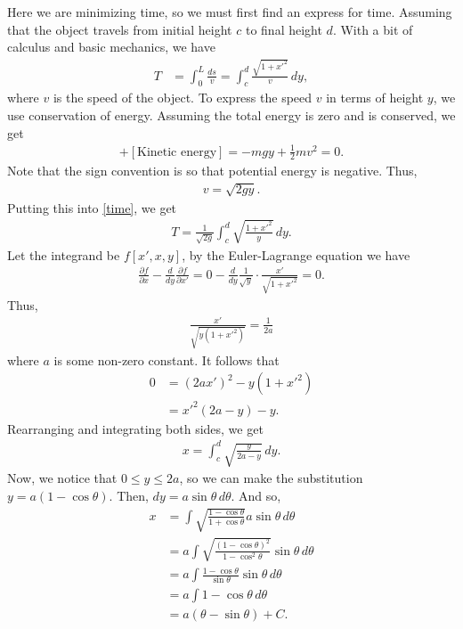 \documentclass{article}
\newcommand{\p}{\partial}
\newcommand{\f}[2]{\frac{#1}{#2}}
\begin{document}
Here we are minimizing time, so we must first find an express for time. Assuming that the object travels from initial height $c$ to final height $d$. With a bit of calculus and basic mechanics, we have
\begin{align}\label{time}
T &= \int_{0}^{L} \frac{ds}{v} = \int_c^d \f{\sqrt{1 + x'^2}}{v}\,dy,
\end{align}
where $v$ is the speed of the object. To express the speed $v$ in terms of height $y$, we use conservation of energy. Assuming the total energy is zero and is conserved, we get
\begin{align}
[\text{Potential Energy}] + [\text{Kinetic energy}] = - mgy + \frac{1}{2}mv^2 = 0.
\end{align}
Note that the sign convention is so that potential energy is negative. Thus,
\begin{align}
v = \sqrt{2gy}.
\end{align}
Putting this into \eqref{time}, we get
\begin{align}
T = \frac{1}{\sqrt{2g}}\int^d_c \sqrt{\f{1 + x'^2}{y}}\,dy.
\end{align}
Let the integrand be $f[x',x,y]$, by the Euler-Lagrange equation we have
\begin{align}
\frac{\p f}{\p x} - \f{d}{dy}\f{\p f}{\p x'} = 0 - \frac{d}{dy}\f{1}{\sqrt{y}}\cdot \f{x'}{\sqrt{1 + x'^2}}  = 0.
\end{align}
Thus,
\begin{align}
\f{x'}{\sqrt{y(1+x'^2)}} = \f{1}{2a}
\end{align}
where $a$ is some non-zero constant. It follows that 
\begin{align}
0 &= (2ax')^2 - y(1+x'^2)\nonumber\\
&= x'^2(2a-y) - y.
\end{align}
Rearranging and integrating both sides, we get
\begin{align}
x = \int_c^d \sqrt{\frac{y}{2a-y}}\,dy.
\end{align}
Now, we notice that $0 \leq y \leq 2a$, so we can make the substitution $y = a(1-\cos\theta)$. Then, $dy = a\sin\theta\,d\theta$. And so,
\begin{align}
x 
&= \int \sqrt{\frac{1-\cos\theta}{1 + \cos\theta}}a\sin\theta\,d\theta \nonumber\\
&= a\int \sqrt{\frac{(1 - \cos\theta)^2}{1 - \cos^2\theta}}\sin\theta\,d\theta \nonumber\\
&= a\int \f{1-\cos\theta}{\sin\theta}\sin\theta\,d\theta\nonumber\\
&= a\int 1-\cos\theta \,d\theta\nonumber\\
&= a(\theta - \sin\theta) + C.
\end{align}
\end{document}
